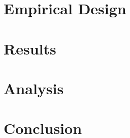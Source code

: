 \documentclass[12pt, a4paper, oneside]{book}
\begin{document}
\chapter{Empirical Design}
\label{sec:experiments}


\chapter{Results}
\label{sec:results}


\chapter{Analysis}
\label{sec:analysis}


\chapter{Conclusion}
\label{sec:conclusion}


\cleardoublepage
{}
\renewcommand{\bibname}{References}



\appendix

\end{document}

